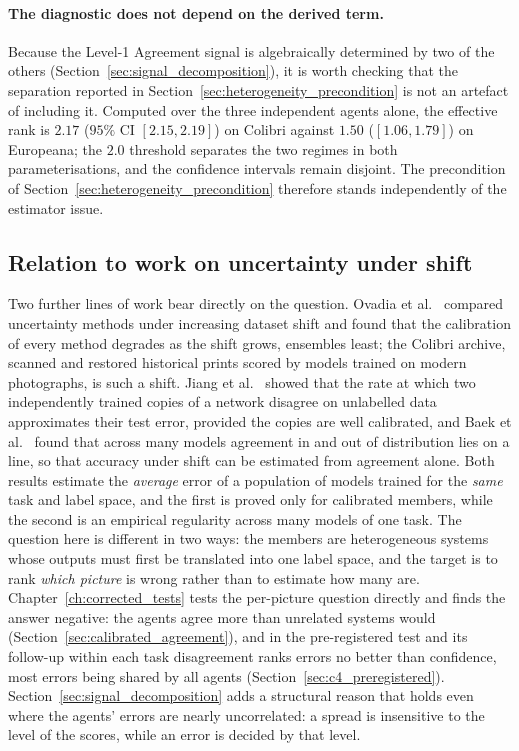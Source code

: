 \documentclass[12pt,a4paper]{report}
\begin{document}
\paragraph{The diagnostic does not depend on the derived term.} Because the Level-1 Agreement signal is algebraically determined by two of the others (Section~\ref{sec:signal_decomposition}), it is worth checking that the separation reported in Section~\ref{sec:heterogeneity_precondition} is not an artefact of including it. Computed over the three independent agents alone, the effective rank is $2.17$ ($95\%$ CI $[2.15,2.19]$) on Colibri against $1.50$ ($[1.06,1.79]$) on Europeana; the $2.0$ threshold separates the two regimes in both parameterisations, and the confidence intervals remain disjoint. The precondition of Section~\ref{sec:heterogeneity_precondition} therefore stands independently of the estimator issue.

\subsection{Relation to work on uncertainty under shift}
\label{sec:moved_shift}
Two further lines of work bear directly on the question. Ovadia et al.\ \cite{ovadia2019trust} compared uncertainty methods under increasing dataset shift and found that the calibration of every method degrades as the shift grows, ensembles least; the Colibri archive, scanned and restored historical prints scored by models trained on modern photographs, is such a shift. Jiang et al.\ \cite{jiang2022disagreement} showed that the rate at which two independently trained copies of a network disagree on unlabelled data approximates their test error, provided the copies are well calibrated, and Baek et al.\ \cite{baek2022agreement} found that across many models agreement in and out of distribution lies on a line, so that accuracy under shift can be estimated from agreement alone. Both results estimate the \emph{average} error of a population of models trained for the \emph{same} task and label space, and the first is proved only for calibrated members, while the second is an empirical regularity across many models of one task. The question here is different in two ways: the members are heterogeneous systems whose outputs must first be translated into one label space, and the target is to rank \emph{which picture} is wrong rather than to estimate how many are. Chapter~\ref{ch:corrected_tests} tests the per-picture question directly and finds the answer negative: the agents agree more than unrelated systems would (Section~\ref{sec:calibrated_agreement}), and in the pre-registered test and its follow-up within each task disagreement ranks errors no better than confidence, most errors being shared by all agents (Section~\ref{sec:c4_preregistered}). Section~\ref{sec:signal_decomposition} adds a structural reason that holds even where the agents' errors are nearly uncorrelated: a spread is insensitive to the level of the scores, while an error is decided by that level.
\end{document}
